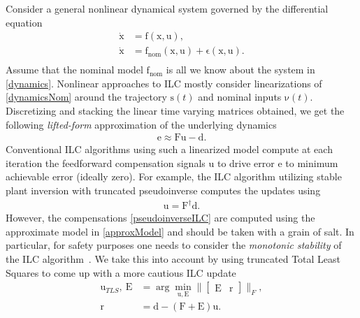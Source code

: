 \documentclass[10pt,a4paper]{article}
\newcommand{\boldvec}[1]{\boldsymbol{\mathrm{#1}}}
\let\vec\boldvec
\newcommand{\state}{\vec{x}} %
\newcommand{\error}{\vec{e}} %
\newcommand{\traj}{\vec{s}} %
\newcommand{\dist}{\vec{\epsilon}} %
\newcommand{\linDist}{\vec{d}} %
\newcommand{\sysInput}{\vec{u}} %
\newcommand{\trjInput}{\vec{\nu}} %
\newcommand{\residual}{\vec{r}} %
\newcommand{\errorMat}{\vec{E}} %
\newcommand{\systemMat}{\vec{F}} %
\newcommand{\dynamics}{\vec{f}}
\newcommand{\dynamicsNominal}{\dynamics_{\mathrm{nom}}}
\begin{document}
Consider a general nonlinear dynamical system governed by the differential equation
%
\begin{align}
\dot{\state} &= \dynamics(\state,\sysInput), \label{dynamics} \\
\dot{\state} &= \dynamicsNominal(\state,\sysInput) + \dist(\state,\sysInput). \label{dynamicsNom}\\
\end{align}
%
\noindent Assume that the nominal model $\dynamicsNominal$ is all we know about the system in \eqref{dynamics}. Nonlinear approaches to ILC mostly consider linearizations of \eqref{dynamicsNom} around the trajectory $\traj(t)$ and nominal inputs $\trjInput(t)$. Discretizing and stacking the linear time varying matrices obtained, we get the following \emph{lifted-form} approximation of the underlying dynamics
%
\begin{equation}
\begin{aligned}
\error \approx \systemMat \sysInput - \linDist.
\end{aligned}
\label{approxModel}
\end{equation}
%
\noindent Conventional ILC algorithms using such a linearized model compute at each iteration the feedforward compensation signals $\sysInput$ to drive error $\error$ to minimum achievable error (ideally zero). For example, the ILC algorithm utilizing stable plant inversion with truncated pseudoinverse computes the updates using %
%
\begin{equation}
\begin{aligned}
\sysInput = \systemMat^{\dagger}\linDist. 
\end{aligned}
\label{pseudoinverseILC}
\end{equation}
%
However, the compensations \eqref{pseudoinverseILC} are computed using the approximate model in \eqref{approxModel} and should be taken with a grain of salt. In particular, for safety purposes one needs to consider the \emph{monotonic stability} of the ILC algorithm~\cite{Bristow06}. We take this into account by using truncated Total Least Squares to come up with a more cautious ILC update
%
\begin{equation}
\begin{aligned}
\sysInput_{TLS}, \ \errorMat &= \arg\min_{\sysInput,\errorMat} \|\begin{bmatrix}\errorMat & \residual \end{bmatrix} \|_{F}, \\
\residual &= \linDist - (\systemMat + \errorMat)\sysInput.
\end{aligned}
\end{equation}
\end{document}
